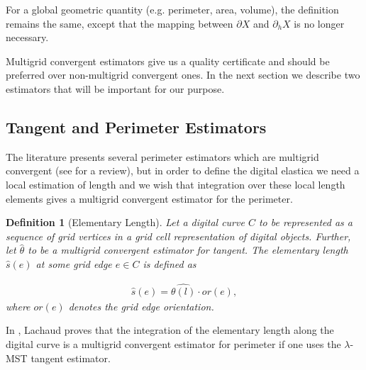 \documentclass[runningheads]{llncs}
\newtheorem{ddef}{Definition}
\begin{document}
	
	For a global geometric quantity (e.g. perimeter, area, volume), the definition remains the same, except that the mapping between $\partial X$ and $\partial_h X$ is no longer necessary.
	
	
	Multigrid convergent estimators give us a quality certificate and should be preferred over non-multigrid convergent ones. In the next section we describe two estimators that will be important for our purpose.
	


\subsection{Tangent and Perimeter Estimators}

The literature presents several perimeter estimators which are multigrid convergent (see \cite{coeurjolly04,coeurjolly12} for a review), but in order to define the digital elastica we need a local estimation of length and we wish that integration over these local length elements gives a multigrid convergent estimator for the perimeter. 

\begin{ddef}[Elementary Length]
	Let a digital curve $C$ to be represented as a sequence of grid vertices in a grid cell representation of digital objects. Further, let $\hat{\theta}$ to be a multigrid convergent estimator for tangent. The elementary length $\hat{s}(e)$ at some grid edge $e\in C$ is defined as
	
	\begin{align*}
		\hat{s}(e) = \hat{\theta(l)} \cdot or(e),
	\end{align*}
	where $or(e)$ denotes the grid edge orientation.
\end{ddef}

	In \cite{lachaud06}, Lachaud proves that the integration of the elementary length along the digital curve is a multigrid convergent estimator for perimeter if one uses the $\lambda$-MST \cite{lachaud07} tangent estimator.
\end{document}
